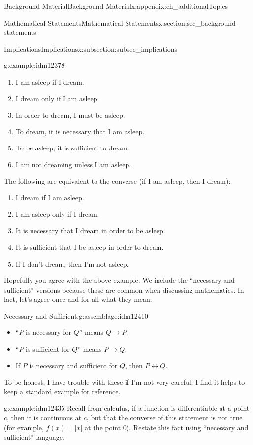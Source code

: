 \documentclass[oneside,10pt,]{book}
\numberwithin{equation}{chapter}
\def\iff{\leftrightarrow}
\def\imp{\rightarrow}
\begin{document}
\begin{appendixptx}{Background Material}{}{Background Material}{}{}{x:appendix:ch_additionalTopics}
\begin{sectionptx}{Mathematical Statements}{}{Mathematical Statements}{}{}{x:section:sec_background-statements}
\begin{subsectionptx}{Implications}{}{Implications}{}{}{x:subsection:subsec_implications}
\begin{example}{}{g:example:idm12378}
\begin{enumerate}
\item{}I am asleep if I dream.%
\item{}I dream only if I am asleep.%
\item{}In order to dream, I must be asleep.%
\item{}To dream, it is necessary that I am asleep.%
\item{}To be asleep, it is sufficient to dream.%
\item{}I am not dreaming unless I am asleep.%
\end{enumerate}
The following are equivalent to the converse (if I am asleep, then I dream):%
\begin{enumerate}
\item{}I dream if I am asleep.%
\item{}I am asleep only if I dream.%
\item{}It is necessary that I dream in order to be asleep.%
\item{}It is sufficient that I be asleep in order to dream.%
\item{}If I don't dream, then I'm not asleep.%
\end{enumerate}
%
\end{example}
Hopefully you agree with the above example. We include the ``necessary and sufficient'' versions because those are common when discussing mathematics. In fact, let's agree once and for all what they mean.%
\begin{assemblage}{Necessary and Sufficient.}{g:assemblage:idm12410}%
\par
%
\begin{itemize}[label=\textbullet]
\item{}``\(P\) is necessary for \(Q\)'' means \(Q \imp P\).%
\item{}``\(P\) is sufficient for \(Q\)'' means \(P \imp Q\).%
\item{}If \(P\) is necessary and sufficient for \(Q\), then \(P \iff Q\).%
\end{itemize}
%
\end{assemblage}
To be honest, I have trouble with these if I'm not very careful. I find it helps to keep a standard example for reference.%
\begin{example}{}{g:example:idm12435}%
Recall from calculus, if a function is differentiable at a point \(c\), then it is continuous at \(c\), but that the converse of this statement is not true (for example, \(f(x) = |x|\) at the point 0). Restate this fact using ``necessary and sufficient'' language.%

\end{example}
\end{subsectionptx}
\end{sectionptx}
\end{appendixptx}
\end{document}
